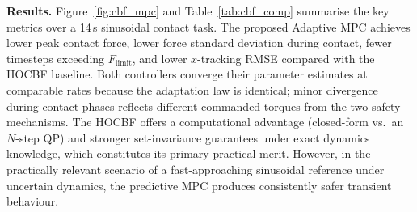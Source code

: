 {\textbf{Results.}
Figure~\ref{fig:cbf_mpc} and Table~\ref{tab:cbf_comp} summarise the key
metrics over a 14\,s sinusoidal contact task.
The proposed Adaptive MPC achieves lower peak contact force, lower force
standard deviation during contact, fewer timesteps exceeding $F_{\mathrm{limit}}$,
and lower $x$-tracking RMSE compared with the HOCBF baseline.
Both controllers converge their parameter estimates at comparable rates
because the adaptation law is identical; minor divergence during contact
phases reflects different commanded torques from the two safety mechanisms.
The HOCBF offers a computational advantage (closed-form vs.\ an $N$-step QP)
and stronger set-invariance guarantees under exact dynamics knowledge, which
constitutes its primary practical merit.
However, in the practically relevant scenario of a fast-approaching
sinusoidal reference under uncertain dynamics, the predictive MPC produces
consistently safer transient behaviour.
}

